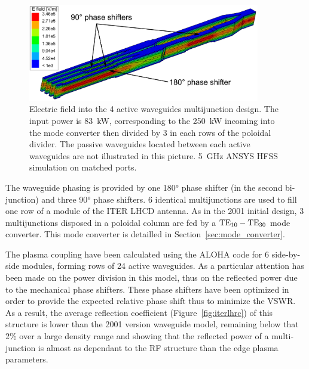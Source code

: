 \begin{figure}[h]
	\centering{}\includegraphics[width=0.9\textwidth]{figures/chap3/ITER_antenna/LH4ITER_MJ_4awg}
	\caption{Electric field into the 4 active waveguides multijunction design.
		The input power is 83~kW, corresponding to the 250~kW incoming
		into the mode converter then divided by 3 in each rows of the poloidal
		divider. The passive waveguides located between each active waveguides
		are not illustrated in this picture. 5~GHz ANSYS HFSS simulation
		on matched ports.}
	\label{fig:Illustration_4awg_design} 
\end{figure}

The waveguide phasing is provided by one 180\si{\degree} phase shifter (in the second bi-junction) and three 90\si{\degree} phase shifters. 6 identical multijunctions are used to fill one row of a module of the ITER LHCD antenna. As in the 2001 initial design, 3 multijunctions disposed in a poloidal column are fed by a ${\mathrm{TE}}_{10}-{\mathrm{TE}}_{30}$ mode converter. This mode converter is detailled in Section~\ref{sec:mode_converter}.

The plasma coupling have been calculated using the ALOHA code for 6 side-by-side modules, forming rows of 24 active waveguides. As a particular attention has been made on the power division in this model, thus on the reflected power due to the mechanical phase shifters. These phase shifters have been optimized in order to provide the expected relative phase shift thus to minimize the VSWR. As a result, the average reflection coefficient (Figure~\ref{fig:iterlhrc}) of this structure is lower than the 2001 version waveguide model, remaining below that 2\% over a large density range and showing that the reflected power of a multi-junction is almost as dependant to the RF structure than the edge plasma parameters.

